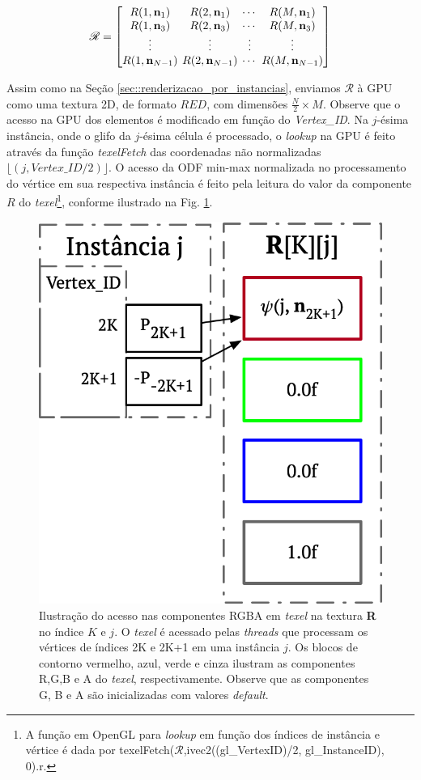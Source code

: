 \documentclass[
    12pt,                %
    oneside,            %
    a4paper,            %
    english,            %
    french,                %
    spanish,            %
    brazil                %
    ]{abntex2}
\begin{document}
\begin{equation}
\label{eq::odf_prototipo3}
\boldsymbol{\mathscr{R}} = 
\begingroup %
\setlength\arraycolsep{2pt}
\begin{bmatrix} 
    R(1, \mathbf{n}_1) &
    R(2, \mathbf{n}_1) & \cdots & 
    R(M, \mathbf{n}_1)  \\
    
    R(1, \mathbf{n}_3) &
    R(2, \mathbf{n}_3) & \cdots & 
    R(M, \mathbf{n}_3) \\ \vdots & \vdots & \vdots & \vdots  \\
    
    R(1, \mathbf{n}_{N-1}) & 
    R(2, \mathbf{n}_{N-1}) & \cdots & 
    R(M, \mathbf{n}_{N-1})
\end{bmatrix}
\endgroup
\end{equation}

Assim como na Seção \ref{sec::renderizacao_por_instancias}, enviamos $\boldsymbol{\mathscr{R}}$ à GPU como uma textura 2D, de formato $RED$, com dimensões $\frac{N}{2}\times M$. Observe que o acesso na GPU dos elementos é modificado em função do \textit{Vertex\_ID}. Na $j$-ésima instância, onde o glifo da $j$-ésima célula é processado, o \textit{lookup} na GPU é feito através da função \textit{texelFetch} das coordenadas não normalizadas $\lfloor (j, Vertex\_ID/2)\rfloor$. O acesso da ODF min-max normalizada no processamento do vértice em sua respectiva instância é feito pela leitura do valor da componente $R$ do \textit{texel}\footnote{A função em OpenGL para \textit{lookup} em função dos índices de instância e vértice é dada por texelFetch($\boldsymbol{\mathscr{R}}$,ivec2((gl\_VertexID)/2, gl\_InstanceID), 0).r.}, conforme ilustrado na Fig. \ref{fig::texelfetch_prototipo3}.

\begin{figure}[htb]
    \centering
    \includegraphics[width=.35\linewidth, angle=0]{figs/Renderizacao_glifos_evolucao/texellookup_RED_2.png}
    \caption{Ilustração do acesso nas componentes RGBA em \textit{texel} na textura \textbf{R} no índice $K$ e $j$. O \textit{texel} é acessado pelas \textit{threads} que processam os vértices de índices 2K e 2K+1 em uma instância $j$. Os blocos de contorno vermelho, azul, verde e cinza ilustram as componentes R,G,B e A do \textit{texel}, respectivamente. Observe que as componentes G, B e A são inicializadas com valores \textit{default}.}
    \label{fig::texelfetch_prototipo3}
\end{figure}
\end{document}
